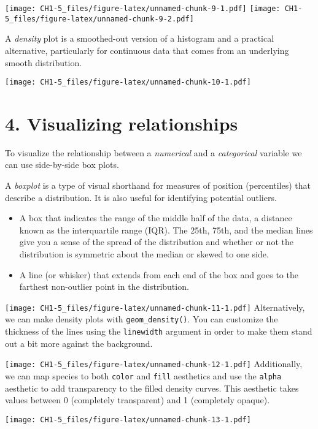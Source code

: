 \documentclass[
]{article}
\begin{document}
\texttt{[image: CH1-5\_files/figure-latex/unnamed-chunk-9-1.pdf]}
\texttt{[image: CH1-5\_files/figure-latex/unnamed-chunk-9-2.pdf]}

A \emph{density} plot is a smoothed-out version of a histogram and a
practical alternative, particularly for continuous data that comes from
an underlying smooth distribution.

\texttt{[image: CH1-5\_files/figure-latex/unnamed-chunk-10-1.pdf]}

\hypertarget{visualizing-relationships}{%
\section{4. Visualizing relationships}\label{visualizing-relationships}}

To visualize the relationship between a \emph{numerical} and a
\emph{categorical} variable we can use side-by-side box plots.

A \emph{boxplot} is a type of visual shorthand for measures of position
(percentiles) that describe a distribution. It is also useful for
identifying potential outliers.

\begin{itemize}
\item
  A box that indicates the range of the middle half of the data, a
  distance known as the interquartile range (IQR). The 25th, 75th, and
  the median lines give you a sense of the spread of the distribution
  and whether or not the distribution is symmetric about the median or
  skewed to one side.
\item
  A line (or whisker) that extends from each end of the box and goes to
  the farthest non-outlier point in the distribution.
\end{itemize}

\texttt{[image: CH1-5\_files/figure-latex/unnamed-chunk-11-1.pdf]}
Alternatively, we can make density plots with \texttt{geom\_density()}.
You can customize the thickness of the lines using the
\texttt{linewidth} argument in order to make them stand out a bit more
against the background.

\texttt{[image: CH1-5\_files/figure-latex/unnamed-chunk-12-1.pdf]}
Additionally, we can map species to both \texttt{color} and
\texttt{fill} aesthetics and use the \texttt{alpha} aesthetic to add
transparency to the filled density curves. This aesthetic takes values
between 0 (completely transparent) and 1 (completely opaque).

\texttt{[image: CH1-5\_files/figure-latex/unnamed-chunk-13-1.pdf]}
\end{document}
